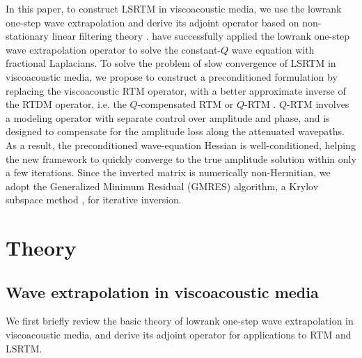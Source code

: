 In this paper, to construct LSRTM in viscoacoustic media, we use the lowrank one-step wave extrapolation \cite[]{me15b} and derive its adjoint operator based on non-stationary linear filtering theory \cite[]{margrave98}. \cite{me15a} have successfully applied the lowrank one-step wave extrapolation operator to solve the constant-$Q$ wave equation with fractional Laplacians. 
To solve the problem of slow convergence of LSRTM in viscoacoustic media, we propose to construct a preconditioned formulation by replacing the viscoacoustic RTM operator,  with a better approximate inverse of the RTDM operator, i.e. the $Q$-compensated RTM or $Q$-RTM \cite[]{zhang10,suh12,bai13,zhu14b}. $Q$-RTM involves a modeling operator with separate control over amplitude and phase, and is designed to compensate for the amplitude loss along the attenuated wavepaths. As a result, the preconditioned wave-equation Hessian is well-conditioned, helping the new framework to quickly converge to the true amplitude solution within only a few iterations. Since the inverted matrix is numerically non-Hermitian, we adopt the Generalized Minimum Residual (GMRES) algorithm, a Krylov subspace method \cite[]{saad1986gmres}, for iterative inversion. 

\newpage

\section{Theory}

\subsection{Wave extrapolation in viscoacoustic media}
We first briefly review the basic theory of lowrank one-step wave extrapolation in visco\-acoustic media, and derive its adjoint operator for applications to RTM and LSRTM. 

